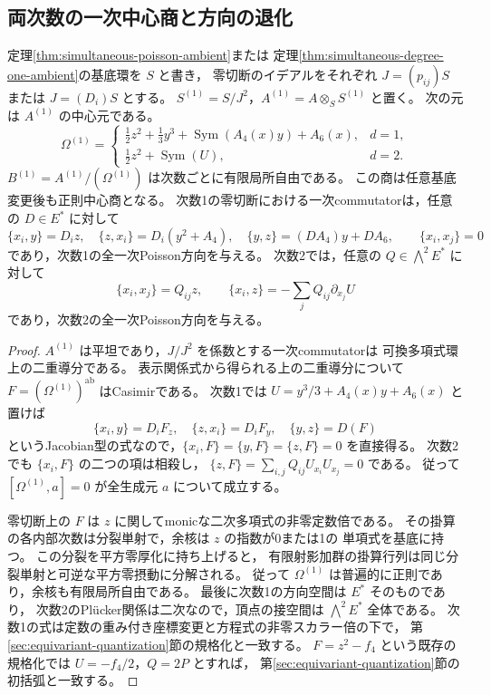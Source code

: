 \subsection{両次数の一次中心商と方向の退化}

\begin{proposition}[全一次Poisson方向の中心商]
\label{prop:simultaneous-first-order-center}
定理\ref{thm:simultaneous-poisson-ambient}または
定理\ref{thm:simultaneous-degree-one-ambient}の基底環を $S$ と書き，
零切断のイデアルをそれぞれ $J=(p_{ij})S$ または $J=(D_i)S$ とする。
$S^{(1)}=S/J^2$，$A^{(1)}=A\otimes_S S^{(1)}$ と置く。
次の元は $A^{(1)}$ の中心元である。
\[
 \Omega^{(1)}=
 \begin{cases}
 \frac12z^2+\frac13y^3+\operatorname{Sym}(A_4(x)y)+A_6(x),&d=1,\\
 \frac12z^2+\operatorname{Sym}(U),&d=2.
 \end{cases}
\]
$B^{(1)}=A^{(1)}/(\Omega^{(1)})$ は次数ごとに有限局所自由である。
この商は任意基底変更後も正則中心商となる。
次数1の零切断における一次commutatorは，任意の $D\in E^*$ に対して
\[
 \{x_i,y\}=D_i z,\quad
 \{z,x_i\}=D_i(y^2+A_4),\quad
 \{y,z\}=(D A_4)y+D A_6,
 \qquad \{x_i,x_j\}=0
\]
であり，次数1の全一次Poisson方向を与える。
次数2では，任意の
$Q\in\bigwedge^2E^*$ に対して
\[
 \{x_i,x_j\}=Q_{ij}z,\qquad
 \{x_i,z\}=-\sum_jQ_{ij}\partial_{x_j}U
\]
であり，次数2の全一次Poisson方向を与える。
\end{proposition}
\begin{proof}
$A^{(1)}$ は平坦であり，$J/J^2$ を係数とする一次commutatorは
可換多項式環上の二重導分である。
表示関係式から得られる上の二重導分について
$F=(\Omega^{(1)})^{\mathrm{ab}}$ はCasimirである。
次数1では $U=y^3/3+A_4(x)y+A_6(x)$ と置けば
\[
 \{x_i,y\}=D_iF_z,\quad
 \{z,x_i\}=D_iF_y,\quad
 \{y,z\}=D(F)
\]
というJacobian型の式なので，$\{x_i,F\}=\{y,F\}=\{z,F\}=0$ を直接得る。
次数2でも $\{x_i,F\}$ の二つの項は相殺し，
$\{z,F\}=\sum_{i,j}Q_{ij}U_{x_i}U_{x_j}=0$ である。
従って $[\Omega^{(1)},a]=0$ が全生成元 $a$ について成立する。

零切断上の $F$ は $z$ に関してmonicな二次多項式の非零定数倍である。
その掛算の各内部次数は分裂単射で，余核は $z$ の指数が0または1の
単項式を基底に持つ。
この分裂を平方零厚化に持ち上げると，
有限射影加群の掛算行列は同じ分裂単射と可逆な平方零摂動に分解される。
従って $\Omega^{(1)}$ は普遍的に正則であり，余核も有限局所自由である。
最後に次数1の方向空間は $E^*$ そのものであり，
次数2のPl\"ucker関係は二次なので，頂点の接空間は
$\bigwedge^2E^*$ 全体である。
次数1の式は定数の重み付き座標変更と方程式の非零スカラー倍の下で，
第\ref{sec:equivariant-quantization}節の規格化と一致する。
$F=z^2-f_4$ という既存の規格化では $U=-f_4/2$，$Q=2P$ とすれば，
第\ref{sec:equivariant-quantization}節の初括弧と一致する。
\end{proof}

